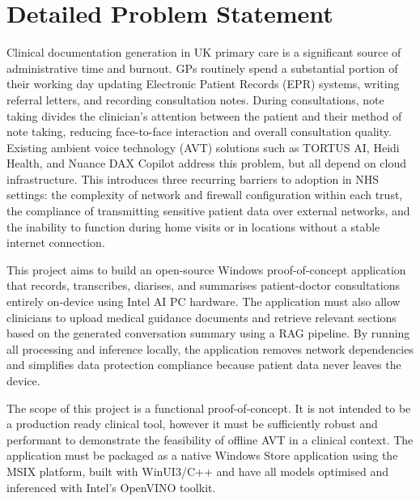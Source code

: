 \section{Detailed Problem Statement}
Clinical documentation generation in UK primary care is a significant source of administrative time and burnout. GPs routinely spend a substantial portion of their working day updating Electronic Patient Records (EPR) systems, writing referral letters, and recording consultation notes. During consultations, note taking divides the clinician's attention between the patient and their method of note taking, reducing face-to-face interaction and overall consultation quality. Existing ambient voice technology (AVT) solutions such as TORTUS AI, Heidi Health, and Nuance DAX Copilot address this problem, but all depend on cloud infrastructure. This introduces three recurring barriers to adoption in NHS settings: the complexity of network and firewall configuration within each trust, the compliance of transmitting sensitive patient data over external networks, and the inability to function during home visits or in locations without a stable internet connection.

This project aims to build an open-source Windows proof-of-concept application that records, transcribes, diarises, and summarises patient-doctor consultations entirely on-device using Intel AI PC hardware. The application must also allow clinicians to upload medical guidance documents and retrieve relevant sections based on the generated conversation summary using a RAG pipeline. By running all processing and inference locally, the application removes network dependencies and simplifies data protection compliance because patient data never leaves the device.

The scope of this project is a functional proof-of-concept. It is not intended to be a production ready clinical tool, however it must be sufficiently robust and performant to demonstrate the feasibility of offline AVT in a clinical context. The application must be packaged as a native Windows Store application using the MSIX platform, built with WinUI3/C++ and have all models optimised and inferenced with Intel's OpenVINO toolkit.


